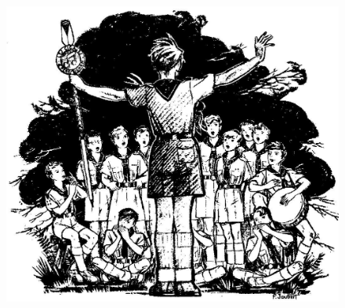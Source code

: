 \documentclass[a4paper,12pt]{article}
\begin{document}
	\begin{figure}
		\includegraphics[width=\linewidth]{titre.jpg}
	\end{figure}
	\newpage

	
\end{document}
